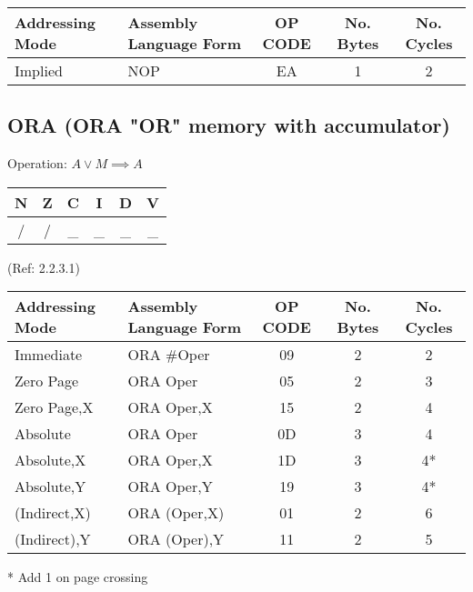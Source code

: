 \documentclass{article}
\begin{document}
  \begin{table}[H]
  \centering
  \begin{tabular}{|l|l|c|c|c|}
  \hline
   Addressing Mode& Assembly Language Form& OP CODE &No. Bytes&No. Cycles\\
  \hline
    Implied       &   NOP                 &    EA   &    1    &    2     \\
  \hline
  \end{tabular}
  \end{table}

  \subsection{ORA (ORA "OR" memory with accumulator)}

  Operation: $A \lor M \implies A$
  \begin{table}[H]
  \centering
  \begin{tabular}{|c c c c c c|}
  \hline
  N&Z&C&I&D&V\\
  \hline
  / & / & \_ & \_ & \_ & \_\\
  \hline
  \end{tabular}
  \end{table}
                                 (Ref: 2.2.3.1)
  \begin{table}[H]
  \centering
  \begin{tabular}{|l|l|c|c|c|}
  \hline
   Addressing Mode& Assembly Language Form& OP CODE &No. Bytes&No. Cycles\\
  \hline
    Immediate     &   ORA \#Oper           &    09   &    2    &    2     \\
    Zero Page     &   ORA Oper            &    05   &    2    &    3     \\
    Zero Page,X   &   ORA Oper,X          &    15   &    2    &    4     \\
    Absolute      &   ORA Oper            &    0D   &    3    &    4     \\
    Absolute,X    &   ORA Oper,X          &    1D   &    3    &    4*    \\
    Absolute,Y    &   ORA Oper,Y          &    19   &    3    &    4*    \\
    (Indirect,X)  &   ORA (Oper,X)        &    01   &    2    &    6     \\
    (Indirect),Y  &   ORA (Oper),Y        &    11   &    2    &    5     \\
  \hline
  \end{tabular}
  \end{table}
  * Add 1 on page crossing
\end{document}
